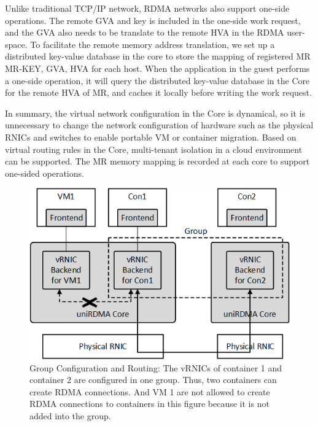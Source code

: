 
Unlike traditional TCP/IP network, RDMA networks also support one-side operations. The remote GVA and key is included in the one-side work request, and the GVA also needs to be translate to the remote HVA in the RDMA user-space. To facilitate the remote memory address translation, we set up a distributed key-value database in the \sys core to store the mapping of registered MR {MR-KEY, GVA, HVA} for each host. When the application in the guest performs a one-side operation, it will query the distributed key-value database in the \sys Core for the remote HVA of MR, and caches it locally before writing the work request.


In summary, the virtual network configuration in the \sys Core is dynamical, so it is unnecessary to change the network configuration of hardware such as the physical RNICs and switches to enable portable VM or container migration. Based on virtual routing rules in the \sys Core, multi-tenant isolation in a cloud environment can be supported. The MR memory mapping is recorded at each \sys core to support one-sided operations.

\begin{figure}[!ht]
	\centering
	\includegraphics[width=1.0\linewidth]{images/route-config}
	\caption{Group Configuration and Routing: The vRNICs of container 1 and container 2 are configured in one group. Thus, two containers can create RDMA connections. And VM 1 are not allowed to create RDMA connections to containers in this figure because it is not added into the group. }
	\label{fig:route-config}
\end{figure}

